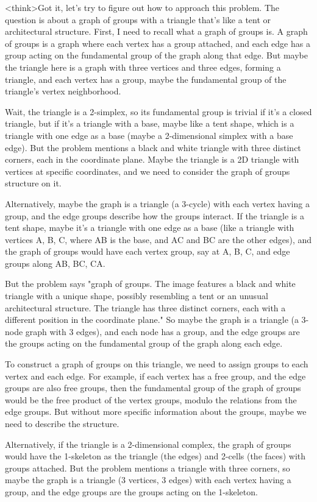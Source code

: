 <think>Got it, let's try to figure out how to approach this problem. The question is about a graph of groups with a triangle that's like a tent or architectural structure. First, I need to recall what a graph of groups is. A graph of groups is a graph where each vertex has a group attached, and each edge has a group acting on the fundamental group of the graph along that edge. But maybe the triangle here is a graph with three vertices and three edges, forming a triangle, and each vertex has a group, maybe the fundamental group of the triangle's vertex neighborhood.

Wait, the triangle is a 2-simplex, so its fundamental group is trivial if it's a closed triangle, but if it's a triangle with a base, maybe like a tent shape, which is a triangle with one edge as a base (maybe a 2-dimensional simplex with a base edge). But the problem mentions a black and white triangle with three distinct corners, each in the coordinate plane. Maybe the triangle is a 2D triangle with vertices at specific coordinates, and we need to consider the graph of groups structure on it.

Alternatively, maybe the graph is a triangle (a 3-cycle) with each vertex having a group, and the edge groups describe how the groups interact. If the triangle is a tent shape, maybe it's a triangle with one edge as a base (like a triangle with vertices A, B, C, where AB is the base, and AC and BC are the other edges), and the graph of groups would have each vertex group, say at A, B, C, and edge groups along AB, BC, CA.

But the problem says "graph of groups. The image features a black and white triangle with a unique shape, possibly resembling a tent or an unusual architectural structure. The triangle has three distinct corners, each with a different position in the coordinate plane." So maybe the graph is a triangle (a 3-node graph with 3 edges), and each node has a group, and the edge groups are the groups acting on the fundamental group of the graph along each edge.

To construct a graph of groups on this triangle, we need to assign groups to each vertex and each edge. For example, if each vertex has a free group, and the edge groups are also free groups, then the fundamental group of the graph of groups would be the free product of the vertex groups, modulo the relations from the edge groups. But without more specific information about the groups, maybe we need to describe the structure.

Alternatively, if the triangle is a 2-dimensional complex, the graph of groups would have the 1-skeleton as the triangle (the edges) and 2-cells (the faces) with groups attached. But the problem mentions a triangle with three corners, so maybe the graph is a triangle (3 vertices, 3 edges) with each vertex having a group, and the edge groups are the groups acting on the 1-skeleton.

